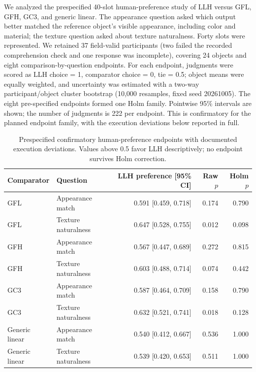 \documentclass[10pt]{article}
\begin{document}
We analyzed the prespecified 40-slot human-preference study of LLH versus GFL, GFH, GC3, and generic linear. The appearance question asked which output better matched the reference object's visible appearance, including color and material; the texture question asked about texture naturalness. Forty slots were represented. We retained 37 field-valid participants (two failed the recorded comprehension check and one response was incomplete), covering 24 objects and eight comparison-by-question endpoints. For each endpoint, judgments were scored as LLH choice = 1, comparator choice = 0, tie = 0.5; object means were equally weighted, and uncertainty was estimated with a two-way participant/object cluster bootstrap (10,000 resamples, fixed seed 20261005). The eight pre-specified endpoints formed one Holm family. Pointwise 95\% intervals are shown; the number of judgments is 222 per endpoint. This is confirmatory for the planned endpoint family, with the execution deviations below reported in full.

\begin{table}[H]
\centering\scriptsize
\caption{Prespecified confirmatory human-preference endpoints with documented execution deviations. Values above 0.5 favor LLH descriptively; no endpoint survives Holm correction.}
\label{tab:human_confirmatory}
\begin{tabular}{llrrr}
\toprule
Comparator & Question & LLH preference [95\% CI] & Raw $p$ & Holm $p$ \\
\midrule
GFL & Appearance match & 0.591 [0.459, 0.718] & 0.174 & 0.790 \\
GFL & Texture naturalness & 0.647 [0.528, 0.755] & 0.012 & 0.098 \\
GFH & Appearance match & 0.567 [0.447, 0.689] & 0.272 & 0.815 \\
GFH & Texture naturalness & 0.603 [0.488, 0.714] & 0.074 & 0.442 \\
GC3 & Appearance match & 0.587 [0.464, 0.709] & 0.158 & 0.790 \\
GC3 & Texture naturalness & 0.632 [0.521, 0.741] & 0.018 & 0.128 \\
Generic linear & Appearance match & 0.540 [0.412, 0.667] & 0.536 & 1.000 \\
Generic linear & Texture naturalness & 0.539 [0.420, 0.653] & 0.511 & 1.000 \\
\bottomrule
\end{tabular}
\end{table}
\end{document}

